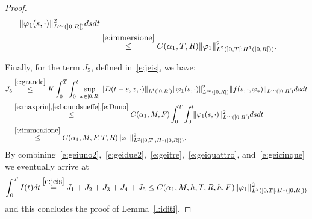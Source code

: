 \documentclass[11pt,leqno]{amsart}
\numberwithin{equation}{section}
\begin{document}
\begin{proof}
\begin{equation}
\begin{split}
  \| {\varphi}_1  (s, \cdot) \|^2_{L^\infty(]0, R[)} 
   ds 
  dt \\ 
  & \stackrel{\eqref{e:immersione}}{\leq} 
  C(\alpha_1, T, R) \| {\varphi}_1 \|^2_{L^2 (]0, T[ ;H^1 (]0, R[ ))}. \phantom{\int}
\end{split}
\end{equation}
Finally, for the term $J_5$, defined in~\eqref{e:jeis}, we have:
\begin{equation}
  \label{e:geicinque}
  \begin{split}
    J_5 & \stackrel{\eqref{e:grande}}{\leq}
    K \int_0^T \int_0^t \sup_{x \in ]0, R[} \| D(t-s, x,
    \cdot) \|_{L^1(]0, R[)} \| {\varphi}_1 (s, \cdot) \|^2_{L^\infty(]0,
      R[)} \| f(s, \cdot, {\varphi}_\ast) \|_{L^\infty (]0,
      R[)} ds dt
    \\
    & \stackrel{\eqref{e:maxprin},\eqref{e:boundsueffe}, \eqref{e:Duno}}{\leq}
    C(\alpha_1, M, F) \int_0^T \int_0^t \! \!  \| {\varphi}_1 (s, \cdot)
    \|^2_{L^\infty(]0, R[)} ds
    dt \\
    & \stackrel{\eqref{e:immersione}}{\leq} C(\alpha_1, M, F, T, R) \|
    {\varphi}_1 \|^2_{L^2 (]0, T[ ;H^1 (]0, R[ ))}.
  \end{split}
\end{equation}
By combining~\eqref{e:geiuno2},~\eqref{e:geidue2},~\eqref{e:geitre},~\eqref{e:geiquattro}, and~\eqref{e:geicinque} we eventually arrive at 
\begin{equation}
  \label{e:finegei}
  \int_0^T  I(t) dt \stackrel{\eqref{e:jeis}}{=} J_1 + J_2 + J_3 + J_4 + J_5 
  \leq
  C(\alpha_1, M, h, T, R, h, F)  \| {\varphi}_1 \|^2_{L^2 (]0, T[ ;H^1 (]0, R[ ))}
\end{equation}
and this concludes the proof of Lemma~\ref{l:iditi}.  
\end{proof}
\end{document}
